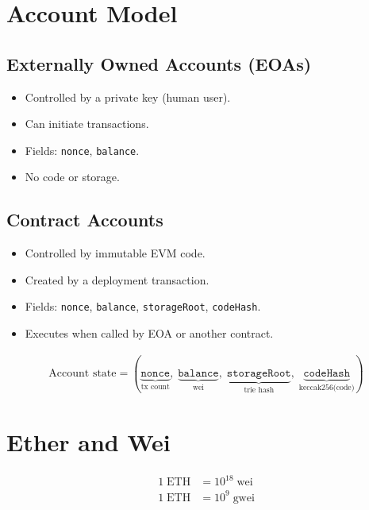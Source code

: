 \documentclass[12pt,a4paper,openany]{book}
\theoremstyle{definition}
\theoremstyle{plain}
\theoremstyle{remark}
\begin{document}
\section{Account Model}

\subsection{Externally Owned Accounts (EOAs)}

\begin{itemize}
  \item Controlled by a private key (human user).
  \item Can initiate transactions.
  \item Fields: \texttt{nonce}, \texttt{balance}.
  \item No code or storage.
\end{itemize}

\subsection{Contract Accounts}

\begin{itemize}
  \item Controlled by immutable EVM code.
  \item Created by a deployment transaction.
  \item Fields: \texttt{nonce}, \texttt{balance}, \texttt{storageRoot},
        \texttt{codeHash}.
  \item Executes when called by EOA or another contract.
\end{itemize}

\begin{align}
  \text{Account state} = (\underbrace{\texttt{nonce}}_{\text{tx count}},\;
  \underbrace{\texttt{balance}}_{\text{wei}},\;
  \underbrace{\texttt{storageRoot}}_{\text{trie hash}},\;
  \underbrace{\texttt{codeHash}}_{\text{keccak256(code)}})
\end{align}

\section{Ether and Wei}

\begin{align}
  1\;\text{ETH} &= 10^{18}\;\text{wei} \\
  1\;\text{ETH} &= 10^{9}\;\text{gwei}
\end{align}
\end{document}
